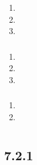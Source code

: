\begin{enumerate}
\def\labelenumi{\arabic{enumi}.}
\tightlist
\item
\item
\item
\end{enumerate}

\hypertarget{section-85}{%
\subsubsection{}\label{section-85}}

\begin{enumerate}
\def\labelenumi{\arabic{enumi}.}
\tightlist
\item
\item
\item
\end{enumerate}

\hypertarget{section-86}{%
\subsubsection{}\label{section-86}}

\begin{enumerate}
\def\labelenumi{\arabic{enumi}.}
\tightlist
\item
\item
\end{enumerate}

\hypertarget{section-87}{%
\subsection{}\label{section-87}}

\hypertarget{section-88}{%
\section{}\label{section-88}}

\hypertarget{section-89}{%
\subsection{}\label{section-89}}

\hypertarget{section-90}{%
\subsection{7.2.1}\label{section-90}}

\hypertarget{section-91}{%
\subsubsection{}\label{section-91}}

